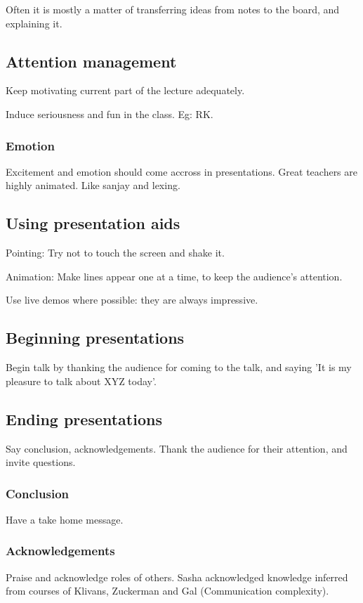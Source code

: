 \documentclass[oneside, article]{memoir}
\begin{document}
Often it is mostly a matter of transferring ideas from notes to the board, and explaining it.

\subsection{Attention management}
Keep motivating current part of the lecture adequately.

Induce seriousness and fun in the class. Eg: RK.

\subsubsection{Emotion}
Excitement and emotion should come accross in presentations. Great teachers are highly animated. Like sanjay and lexing.

\subsection{Using presentation aids}
Pointing: Try not to touch the screen and shake it.

Animation: Make lines appear one at a time, to keep the audience's attention.

Use live demos where possible: they are always impressive.

\subsection{Beginning presentations}
Begin talk by thanking the audience for coming to the talk, and saying 'It is my pleasure to talk about XYZ today'.

\subsection{Ending presentations}
Say conclusion, acknowledgements. Thank the audience for their attention, and invite questions.

\subsubsection{Conclusion}
Have a take home message.

\subsubsection{Acknowledgements}
Praise and acknowledge roles of others. Sasha acknowledged knowledge inferred from courses of Klivans, Zuckerman and Gal (Communication complexity).
\end{document}
